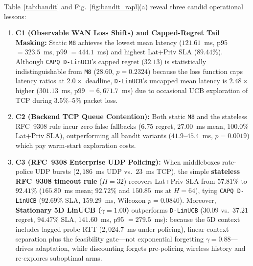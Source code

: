 \documentclass[10pt,journal,compsoc]{IEEEtran}
\begin{document}
Table~\ref{tab:bandit} and Fig.~\ref{fig:bandit_rapl}(a) reveal three candid operational lessons:
\begin{enumerate}
    \item \textbf{C1 (Observable WAN Loss Shifts) and Capped-Regret Tail Masking:} Static \texttt{M8} achieves the lowest mean latency ($121.61$~ms, p95 $= 323.5$~ms, p99 $= 444.1$~ms) and highest Lat+Priv SLA ($89.44\%$). Although \texttt{CAPQ D-LinUCB}'s capped regret ($32.13$) is statistically indistinguishable from \texttt{M8} ($28.60$, $p=0.2324$) because the loss function caps latency ratios at $2.0\times$ deadline, \texttt{D-LinUCB}'s uncapped mean latency is $2.48\times$ higher ($301.13$~ms, p99 $= 6{,}671.7$~ms) due to occasional UCB exploration of TCP during $3.5\%\text{--}5\%$ packet loss.
    \item \textbf{C2 (Backend TCP Queue Contention):} Both static \texttt{M8} and the stateless RFC~9308 rule incur zero false fallbacks ($6.75$ regret, $27.00$~ms mean, $100.0\%$ Lat+Priv SLA), outperforming all bandit variants ($41.9\text{--}45.4$~ms, $p=0.0019$) which pay warm-start exploration costs.
    \item \textbf{C3 (RFC~9308 Enterprise UDP Policing):} When middleboxes rate-police UDP bursts ($2{,}186$~ms UDP vs.\ $23$~ms TCP), the simple \textbf{stateless RFC~9308 timeout rule} ($H=32$) recovers Lat+Priv SLA from $57.81\%$ to $\mathbf{92.41\%}$ ($165.80$~ms mean; $92.72\%$ and $150.85$~ms at $H=64$), tying \texttt{CAPQ D-LinUCB} ($92.69\%$ SLA, $159.29$~ms, Wilcoxon $p=0.0840$). Moreover, \textbf{Stationary 5D LinUCB ($\gamma=1.00$)} outperforms \texttt{D-LinUCB} ($30.09$ vs.\ $37.21$ regret, $94.47\%$ SLA, $141.60$~ms, p95 $= 279.5$~ms): because the 5D context includes lagged probe RTT ($2{,}024.7$~ms under policing), linear context separation plus the feasibility gate---not exponential forgetting $\gamma=0.88$---drives adaptation, while discounting forgets pre-policing wireless history and re-explores suboptimal arms.
\end{enumerate}
\end{document}
